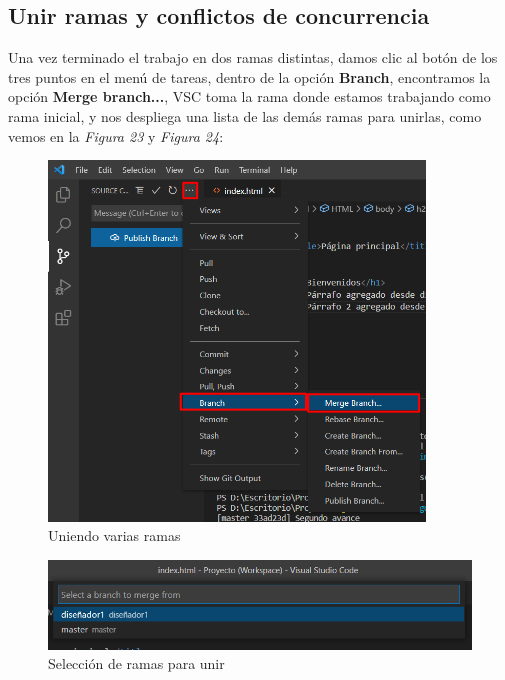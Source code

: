 \subsection{Unir ramas y conflictos de concurrencia}
\hspace{0.55cm}Una vez terminado el trabajo en dos ramas distintas, damos clic al botón de los tres puntos en el menú de tareas, dentro de la opción \textbf{Branch}, encontramos la opción \textbf{Merge branch...}, VSC toma la rama donde estamos trabajando como rama inicial, y nos despliega una lista de las demás ramas para unirlas, como vemos en la \textit{Figura 23} y \textit{Figura 24}:
\begin{figure}[H]
    \begin{center}
        \caption{Uniendo varias ramas}
        \label{fig: 23}
        \includegraphics[width=10cm]{capturas/merge1.png}
    \end{center}
\end{figure}
\begin{figure}[H]
    \begin{center}
        \caption{Selección de ramas para unir}
        \label{fig: 24}
        \includegraphics[width=\textwidth]{capturas/merge2.png}
    \end{center}
\end{figure}


